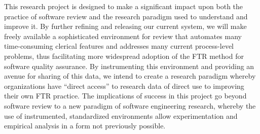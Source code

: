 This research project is designed to make a significant impact upon both
the practice of software review and the research paradigm used to
understand and improve it.  By further refining and releasing our current
system, we will make freely available a sophisticated environment for
review that automates many time-consuming clerical features and addresses
many current process-level problems, thus facilitating more widespread
adoption of the FTR method for software quality assurance.  By
instrumenting this environment and providing an avenue for sharing of this
data, we intend to create a research paradigm whereby organizations have
``direct access'' to research data of direct use to improving their own FTR
practice.  The implications of success in this project go beyond software
review to a new paradigm of software engineering research, whereby the use
of instrumented, standardized environments allow experimentation and
empirical analysis in a form not previously possible.



